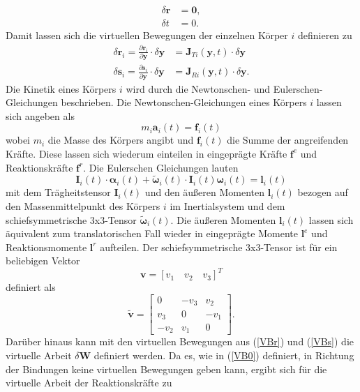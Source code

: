 \begin{align}
\delta \pmb{r} &= \pmb{0},\label{VB0}\\
\delta t &= 0.
\end{align} 
Damit lassen sich die virtuellen Bewegungen der einzelnen Körper $i$ definieren zu
\begin{align}\label{VBr}
\delta \pmb{r}_i = \frac{\partial\pmb{r}_i}{\partial\pmb{y}}\cdot \delta\pmb{y} &= \pmb{J}_{Ti}(\pmb{y},t)\cdot\delta\pmb{y}\\
\delta \pmb{s}_i = \frac{\partial\pmb{s}_i}{\partial\pmb{y}}\cdot \delta\pmb{y} &= \pmb{J}_{Ri}(\pmb{y},t)\cdot\delta\pmb{y}.\label{VBs}
\end{align}
Die Kinetik eines Körpers $i$ wird durch die Newtonschen- und Eulerschen-Gleichungen beschrieben. 
Die Newtonschen-Gleichungen eines Körpers $i$ lassen sich angeben als
\begin{equation}\label{NewtonGl}
m_i \pmb{a}_i(t) = \pmb{f}_i(t)
\end{equation}
wobei $m_i$ die Masse des Körpers angibt und $\pmb{f}_i(t)$ die Summe der angreifenden Kräfte. Diese lassen sich wiederum einteilen in eingeprägte Kräfte $\pmb{f}^e$ und Reaktionskräfte $\pmb{f}^r$.
Die Eulerschen Gleichungen lauten
\begin{equation}\label{EulerGl}
\pmb{I}_i(t)\cdot\pmb{\alpha}_i(t) + \tilde{\pmb{\omega}}_i(t)\cdot \pmb{I}_i(t)\pmb{\omega}_i(t)= \pmb{l}_i(t)
\end{equation}
mit dem Trägheitstensor $\pmb{I}_i(t)$ und den äußeren Momenten $\pmb{l}_i(t)$ bezogen auf den Massenmittelpunkt des Körpers $i$ im Inertialsystem und dem schiefsymmetrische 3x3-Tensor $\tilde{\pmb{\omega}}_i(t)$. Die äußeren Momenten $\pmb{l}_i(t)$ lassen sich äquivalent zum translatorischen Fall wieder in eingeprägte Momente $\pmb{l}^e$ und Reaktionsmomente $\pmb{l}^r$ aufteilen. Der schiefsymmetrische 3x3-Tensor ist für ein beliebigen Vektor 
\begin{equation}
\pmb{v} = [v_1 \quad v_2 \quad v_3]^T
\end{equation}
definiert als
\begin{equation}
\tilde{\pmb{v}} = \begin{bmatrix} 0 & -v_3 & v_2 \\ v_3 & 0 & -v_1 \\ -v_2 & v_1 & 0 \end{bmatrix}.
\end{equation}
Darüber hinaus kann mit den virtuellen Bewegungen aus (\ref{VBr}) und (\ref{VBs}) die virtuelle Arbeit $\delta \pmb{W}$ definiert werden. Da es, wie in (\ref{VB0}) definiert, in Richtung der Bindungen keine virtuellen Bewegungen geben kann, ergibt sich für die virtuelle Arbeit der Reaktionskräfte zu
